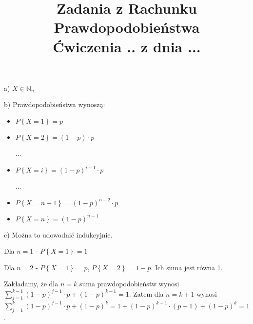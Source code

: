 \documentclass[fleqn]{article}
\begin{document}
\title{Zadania z Rachunku Prawdopodobieństwa \\ Ćwiczenia .. z dnia ...}
\date{}
\medskip
{}
\medskip

a) $X\in\mathbb{N}_n$

b) Prawdopodobieństwa wynoszą:
\begin{itemize}
\item $P\left\lbrace X=1 \right\rbrace=p$
\item $P\left\lbrace X=2 \right\rbrace=\left(1-p\right)\cdot p$

...

\item $P\left\lbrace X=i \right\rbrace=\left(1-p\right)^{i-1}\cdot p$

...

\item $P\left\lbrace X=n-1 \right\rbrace=\left(1-p\right)^{n-2}\cdot p$
\item $P\left\lbrace X=n \right\rbrace=\left(1-p\right)^{n-1}$
\end{itemize}
c) Można to udowodnić indukcyjnie. 

Dla $n=1$ - $P\left\lbrace X=1 \right\rbrace=1$ 

Dla $n=2$ - $P\left\lbrace X=1 \right\rbrace=p$, $P\left\lbrace X=2 \right\rbrace=1-p$. Ich suma jest równa 1.

Zakładamy, że dla $n=k$ suma prawdopodobieństw wynosi $\sum\limits_{j=1}^{k-1}\left(1-p\right)^{j-1}\cdot p+\left(1-p\right)^{k-1}=1$.
Zatem dla $n=k+1$ wynosi $\sum\limits_{j=1}^{k}\left(1-p\right)^{j-1}\cdot p+\left(1-p\right)^{k}=1+\left(1-p\right)^{k-1}\cdot \left( p-1\right)+\left(1-p\right)^{k}=1$. 
\end{document}
